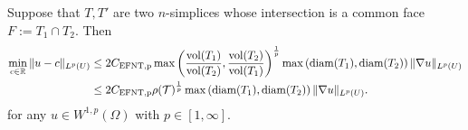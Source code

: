 \documentclass[a4paper]{article}
\begin{document}
\begin{lemma}\label{lemma:poincarefriedrichsoverfacepatch}
    Suppose that $T, T'$ are two $n$-simplices whose intersection is a common face $F := T_1 \cap T_2$. Then 
    \begin{align*}
        \min\limits_{ c \in {\mathbb R} }
        \| u - c \|_{L^{p}(U)}
        &
        \leq 
        2 C_{\rm{EFNT},p}
        \max\left( 
            \frac{ \operatorname{vol}(T_1) }{ \operatorname{vol}(T_2) }
            ,
            \frac{ \operatorname{vol}(T_2) }{ \operatorname{vol}(T_1) }
        \right)^{\frac 1 p}
        \max\left( {\operatorname{diam}}(T_1), {\operatorname{diam}}(T_2) \right)
        \| \nabla u \|_{L^{p}(U)}
        \\&
        \leq 
        2 C_{\rm{EFNT},p}
        \rho({\mathcal T})^{\frac 1 p}
        \max\left( {\operatorname{diam}}(T_1), {\operatorname{diam}}(T_2) \right)
        \| \nabla u \|_{L^{p}(U)}
        .
    \end{align*}
    for any $u \in W^{1,p}(\Omega)$ with $p \in [1,\infty]$.
\end{lemma}
\end{document}
